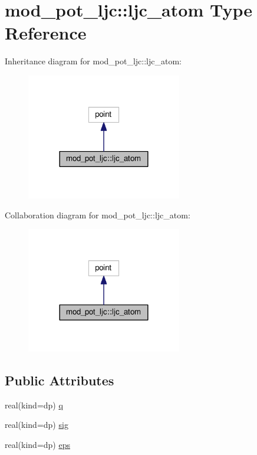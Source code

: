 \hypertarget{structmod__pot__ljc_1_1ljc__atom}{}\section{mod\+\_\+pot\+\_\+ljc\+:\+:ljc\+\_\+atom Type Reference}
\label{structmod__pot__ljc_1_1ljc__atom}


Inheritance diagram for mod\+\_\+pot\+\_\+ljc\+:\+:ljc\+\_\+atom\+:\nopagebreak
\begin{figure}[H]
\begin{center}
\leavevmode
\includegraphics[width=192pt]{structmod__pot__ljc_1_1ljc__atom__inherit__graph}
\end{center}
\end{figure}


Collaboration diagram for mod\+\_\+pot\+\_\+ljc\+:\+:ljc\+\_\+atom\+:\nopagebreak
\begin{figure}[H]
\begin{center}
\leavevmode
\includegraphics[width=192pt]{structmod__pot__ljc_1_1ljc__atom__coll__graph}
\end{center}
\end{figure}
\subsection*{Public Attributes}
\begin{DoxyCompactItemize}
\item 
real(kind=dp) \hyperlink{structmod__pot__ljc_1_1ljc__atom_a94e32d61122a45a46b7f0d82c0e13c40}{q}
\item 
real(kind=dp) \hyperlink{structmod__pot__ljc_1_1ljc__atom_a2213de956be81f40a4c158a873058040}{sig}
\item 
real(kind=dp) \hyperlink{structmod__pot__ljc_1_1ljc__atom_a9c100db84a17fb8ba3e048b0f7c5fcce}{eps}
\end{DoxyCompactItemize}


